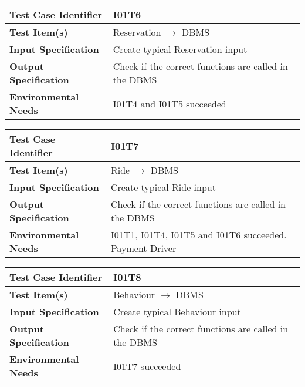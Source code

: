 \begin{center}
	\vspace{0.6cm}
	\begin{tabular}{|l|l|}
		\hline
		\textbf{Test Case Identifier} & I01T6 \bigstrut \\\hline
		\textbf{Test Item(s)} & Reservation \ensuremath{\rightarrow} DBMS \bigstrut \\\hline
		\textbf{Input Specification} & Create typical Reservation input \bigstrut \\\hline
		\textbf{Output Specification} & Check if the correct functions are called in the DBMS \bigstrut \\\hline
		\textbf{Environmental Needs} & I01T4 and I01T5 succeeded\bigstrut \\\hline
	\end{tabular}
\end{center}

\begin{center}
	\vspace{0.6cm}
	\begin{tabular}{|l|l|}
		\hline
		\textbf{Test Case Identifier} & I01T7 \bigstrut \\\hline
		\textbf{Test Item(s)} & Ride \ensuremath{\rightarrow} DBMS \bigstrut \\\hline
		\textbf{Input Specification} & Create typical Ride input \bigstrut \\\hline
		\textbf{Output Specification} & Check if the correct functions are called in the DBMS \bigstrut \\\hline
		\textbf{Environmental Needs} & I01T1, I01T4, I01T5 and I01T6 succeeded. Payment Driver\bigstrut \\\hline
	\end{tabular}
\end{center}

\begin{center}
	\vspace{0.6cm}
	\begin{tabular}{|l|l|}
		\hline
		\textbf{Test Case Identifier} & I01T8 \bigstrut \\\hline
		\textbf{Test Item(s)} & Behaviour \ensuremath{\rightarrow} DBMS \bigstrut \\\hline
		\textbf{Input Specification} & Create typical Behaviour input \bigstrut \\\hline
		\textbf{Output Specification} & Check if the correct functions are called in the DBMS \bigstrut \\\hline
		\textbf{Environmental Needs} & I01T7 succeeded \bigstrut \\\hline
	\end{tabular}
\end{center}

